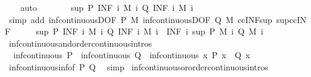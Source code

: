 \begin{isabellebody}
\ \ \isamarkupfalse%
\ auto\isanewline
\ \ \isamarkupfalse%
\ \isamarkupfalse%
\ {\isachardoublequoteopen}{\isasymdots}\ {\isasymle}\ sup\ {\isacharparenleft}P\ {\isacharparenleft}INF\ i{\isachardot}\ M\ i{\isacharparenright}{\isacharparenright}\ {\isacharparenleft}Q\ {\isacharparenleft}INF\ i{\isachardot}\ M\ i{\isacharparenright}{\isacharparenright}{\isachardoublequoteclose}\isanewline
\ \ \ \ \isamarkupfalse%
\ {\isacharparenleft}simp\ add{\isacharcolon}\ inf{\isacharunderscore}continuousD{\isacharbrackleft}OF\ P\ M{\isacharbrackright}\ inf{\isacharunderscore}continuousD{\isacharbrackleft}OF\ Q\ M{\isacharbrackright}\ ccINF{\isacharunderscore}sup\ sup{\isacharunderscore}ccINF{\isacharparenright}\isanewline
\ \ \isamarkupfalse%
\ \isamarkupfalse%
\ {\isachardoublequoteopen}sup\ {\isacharparenleft}P\ {\isacharparenleft}INF\ i{\isachardot}\ M\ i{\isacharparenright}{\isacharparenright}\ {\isacharparenleft}Q\ {\isacharparenleft}INF\ i{\isachardot}\ M\ i{\isacharparenright}{\isacharparenright}\ {\isasymge}\ {\isacharparenleft}INF\ i{\isachardot}\ sup\ {\isacharparenleft}P\ {\isacharparenleft}M\ i{\isacharparenright}{\isacharparenright}\ {\isacharparenleft}Q\ {\isacharparenleft}M\ i{\isacharparenright}{\isacharparenright}{\isacharparenright}{\isachardoublequoteclose}\ \isacommand{{\isachardot}}\isamarkupfalse%
\isanewline
{}\isamarkupfalse%
%
\endisatagproof
{\isafoldproof}%
%
\isadelimproof
\isanewline
%
\endisadelimproof
\isanewline
{}\isamarkupfalse%
\ inf{\isacharunderscore}continuous{\isacharunderscore}and{\isacharbrackleft}order{\isacharunderscore}continuous{\isacharunderscore}intros{\isacharbrackright}{\isacharcolon}\isanewline
\ \ {\isachardoublequoteopen}inf{\isacharunderscore}continuous\ P\ {\isasymLongrightarrow}\ inf{\isacharunderscore}continuous\ Q\ {\isasymLongrightarrow}\ inf{\isacharunderscore}continuous\ {\isacharparenleft}{\isasymlambda}x{\isachardot}\ P\ x\ {\isasymand}\ Q\ x{\isacharparenright}{\isachardoublequoteclose}\isanewline
%
\isadelimproof
\ \ %
\endisadelimproof
%
\isatagproof
{}\isamarkupfalse%
\ inf{\isacharunderscore}continuous{\isacharunderscore}inf{\isacharbrackleft}of\ P\ Q{\isacharbrackright}\ \isamarkupfalse%
\ simp%
\endisatagproof
{\isafoldproof}%
%
\isadelimproof
\isanewline
%
\endisadelimproof
\isanewline
{}\isamarkupfalse%
\ inf{\isacharunderscore}continuous{\isacharunderscore}or{\isacharbrackleft}order{\isacharunderscore}continuous{\isacharunderscore}intros{\isacharbrackright}{\isacharcolon}\isanewline

\end{isabellebody}
